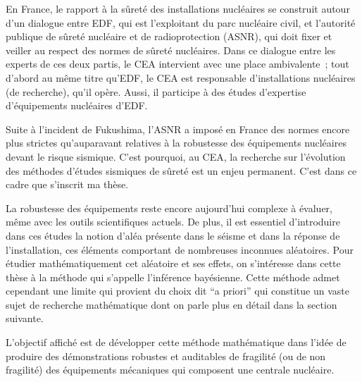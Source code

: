 \documentclass[a4paper]{book}
\begin{document}
En France, le rapport à la sûreté des installations nucléaires se construit autour d'un dialogue entre EDF, qui est l'exploitant du parc nucléaire civil, et l'autorité publique de sûreté nucléaire et de radioprotection (ASNR), qui doit fixer et veiller au respect des normes de sûreté nucléaires. Dans ce dialogue entre les experts de ces deux partis, le CEA intervient avec une place ambivalente~; tout d'abord au même titre qu'EDF, le CEA est responsable d'installations nucléaires (de recherche), qu'il opère. Aussi, il participe à des études d'expertise d'équipements nucléaires d'EDF. 

Suite à l'incident de Fukushima, l'ASNR a imposé en France des normes encore plus strictes qu'auparavant relatives à la robustesse des équipements nucléaires devant le risque sismique. C'est pourquoi, au CEA, la recherche sur l'évolution des méthodes d'études sismiques de sûreté est un enjeu permanent. C'est dans ce cadre que s'inscrit ma thèse.

La robustesse des équipements reste encore aujourd'hui complexe à évaluer, même avec les outils scientifiques actuels. De plus, il est essentiel d'introduire dans ces études la notion d'aléa présente dans le séisme et dans la réponse de l'installation, ces éléments comportant de nombreuses inconnues aléatoires.
Pour étudier mathématiquement cet aléatoire et ses effets, on s'intéresse dans cette thèse à la méthode qui s'appelle l'inférence bayésienne.
Cette méthode admet cependant une limite qui provient du choix dit ``a priori'' qui constitue un vaste sujet de recherche mathématique dont on parle plus en détail dans la section suivante. 

L'objectif affiché est de développer cette méthode mathématique dans l'idée de produire des démonstrat\-ions robustes et auditables de fragilité (ou de non fragilité) des équipements mécaniques qui composent une centrale nucléaire. 










\end{document}
